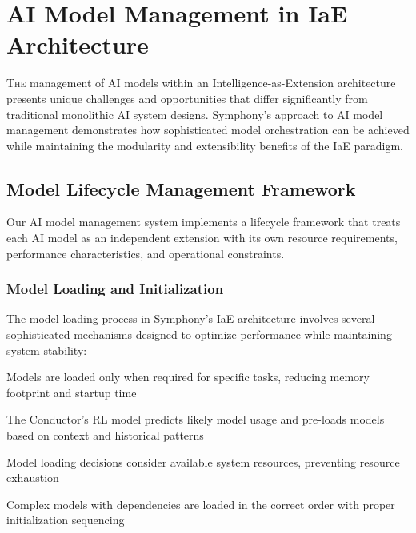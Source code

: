 
\section{AI Model Management in IaE Architecture}
\label{sec:ai-model-management}

\lettrine{T}{he} management of AI models within an Intelligence-as-Extension architecture presents unique challenges and opportunities that differ significantly from traditional monolithic AI system designs. Symphony's approach to AI model management demonstrates how sophisticated model orchestration can be achieved while maintaining the modularity and extensibility benefits of the IaE paradigm.

\subsection{Model Lifecycle Management Framework}

Our AI model management system implements a lifecycle framework that treats each AI model as an independent extension with its own resource requirements, performance characteristics, and operational constraints.

\subsubsection{Model Loading and Initialization}

The model loading process in Symphony's IaE architecture involves several sophisticated mechanisms designed to optimize performance while maintaining system stability:

\begin{description}[leftmargin=4cm,labelwidth=3.5cm]
    \item[\textbf{Lazy Loading}] Models are loaded only when required for specific tasks, reducing memory footprint and startup time
    \item[\textbf{Predictive Pre-loading}] The Conductor's RL model predicts likely model usage and pre-loads models based on context and historical patterns
    \item[\textbf{Resource-Aware Loading}] Model loading decisions consider available system resources, preventing resource exhaustion
    \item[\textbf{Dependency Resolution}] Complex models with dependencies are loaded in the correct order with proper initialization sequencing
\end{description}

